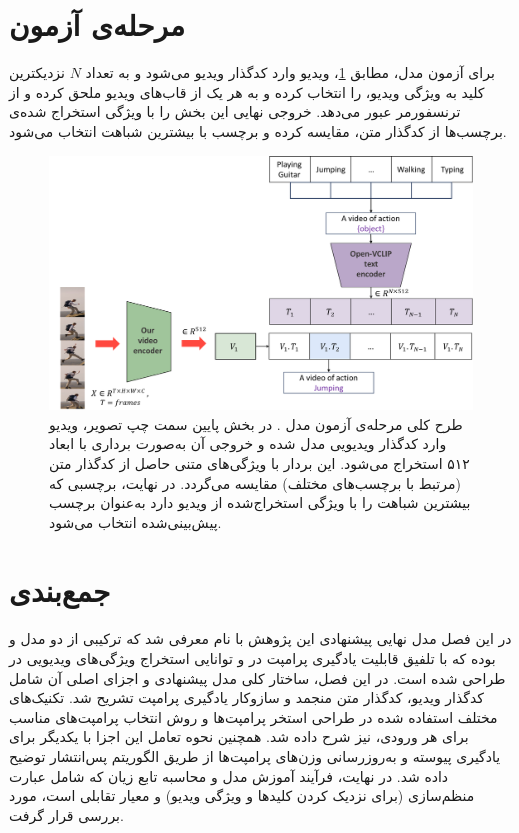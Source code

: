 \section{مرحله‌ی آزمون }
برای آزمون مدل، مطابق \cref{fig.35}، ویدیو وارد کدگذار ویدیو می‌شود و به تعداد $N$ نزدیکترین کلید به ویژگی ویدیو، را انتخاب کرده و به هر یک از قاب‌های ویدیو ملحق کرده و از ترنسفورمر عبور می‌دهد. خروجی نهایی این بخش را با ویژگی استخراج شده‌ی برچسب‌ها از کدگذار متن، مقایسه کرده و برچسب با بیشترین شباهت انتخاب می‌شود.
‌\begin{figure}
	\centering\includegraphics[scale=.48]{Images/Chapter3/test_phase.png}
	\caption[طرح کلی مرحله‌ی آزمون مدل ]{طرح کلی مرحله‌ی آزمون مدل .
	در بخش پایین سمت چپ تصویر، ویدیو وارد کدگذار ویدیویی مدل شده و خروجی آن به‌صورت برداری با ابعاد ۵۱۲ استخراج می‌شود. این بردار با ویژگی‌های متنی حاصل از کدگذار متن (مرتبط با برچسب‌های مختلف) مقایسه می‌گردد. در نهایت، برچسبی که بیشترین شباهت را با ویژگی استخراج‌شده از ویدیو دارد به‌عنوان برچسب پیش‌بینی‌شده انتخاب می‌شود.
	}
	\label{fig.35}
\end{figure}
\section{جمع‌بندی}
در این فصل مدل نهایی پیشنهادی این پژوهش با نام  معرفی شد که ترکیبی از دو مدل  و  بوده که با تلفیق قابلیت یادگیری پرامپت در  و توانایی استخراج ویژگی‌های ویدیویی در  طراحی شده است. در این فصل، ساختار کلی مدل پیشنهادی و اجزای اصلی آن شامل کدگذار ویدیو، کدگذار متن منجمد و سازوکار یادگیری پرامپت تشریح شد. تکنیک‌های مختلف استفاده شده در طراحی استخر پرامپت‌ها و روش انتخاب پرامپت‌های مناسب برای هر ورودی، نیز شرح داده شد. همچنین نحوه تعامل این اجزا با یکدیگر برای یادگیری پیوسته و به‌روزرسانی وزن‌های پرامپت‌ها از طریق الگوریتم پس‌انتشار توضیح داده شد. در نهایت، فرآیند آموزش مدل و محاسبه تابع زیان که شامل عبارت منظم‌سازی (برای نزدیک کردن کلیدها و ویژگی ویدیو) و معیار تقابلی است، مورد بررسی قرار گرفت.


